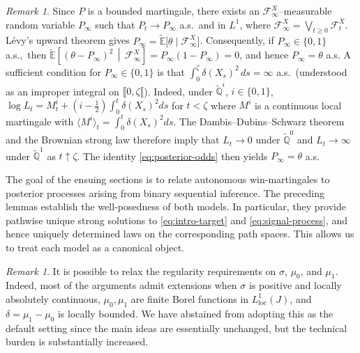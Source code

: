 \documentclass[11pt, reqno]{amsart}
\theoremstyle{plain}
\theoremstyle{remark}
\newtheorem{remark}[theorem]{Remark}
\numberwithin{equation}{section}
\begin{document}
\begin{remark}\label{rmk:consistency}
Since $P$ is a bounded martingale, there exists an
$\mathcal F_\infty^X$--measurable random variable $P_\infty$ such that
$P_t\to P_\infty$ a.s.~and in $L^1$, where
$\mathcal F_\infty^X=\bigvee_{t\geq0} \mathcal{F}^X_t$.
L\'evy's upward theorem gives $P_\infty=\widetilde{\mathbb E}
  \bigl[\theta\mid\mathcal F_\infty^X\bigr]$.
Consequently, if $P_\infty\in\{0,1\}$ a.s.,~then $\widetilde{\mathbb E}
  \left[
    (\theta-P_\infty)^2
    \,\middle|\,
    \mathcal F_\infty^X
  \right]
  =
  P_\infty(1-P_\infty)
  =
  0$,
and hence $P_\infty=\theta$ a.s. A sufficient condition for $P_\infty\in\{0,1\}$ is that $\int_0^\zeta \delta(X_s)^2\,ds=\infty$ a.s.~(understood as an improper integral on $\llbracket 0, \zeta\llbracket$). Indeed, under $\widetilde{\mathbb Q}^i$, $i\in\{0,1\}$,
$\log L_t
  =
  M_t^i
  +
  \left(i-\frac12\right)
  \int_0^t\delta(X_s)^2ds$ for $t<\zeta$
where $M^i$ is a continuous local martingale with $\langle M^i\rangle_t
  =
  \int_0^t\delta(X_s)^2ds$.
The Dambis--Dubins--Schwarz theorem
\cite[Theorem~3.4.6]{karatzas-shreve} and the Brownian strong law
therefore imply that $L_t\to0$ under $\widetilde{\mathbb Q}^0$ and
$L_t\to\infty$ under $\widetilde{\mathbb Q}^1$ as $t\uparrow\zeta$.
The identity \eqref{eq:posterior-odds} then yields
$P_\infty=\theta$ a.s.
\end{remark}



%

The goal of the ensuing sections is to relate autonomous win-martingales to posterior processes arising from binary sequential inference. The preceding lemmas establish the well-posedness of both models. In particular, they provide pathwise unique strong solutions to \eqref{eq:intro-target} and \eqref{eq:signal-process}, and hence uniquely determined laws on the corresponding path spaces. This allows us to treat each model as a canonical object.

%
%

\begin{remark}
    It is possible to relax the regularity requirements on $\sigma$, $\mu_0$, and $\mu_1$. Indeed, most of the arguments admit extensions when $\sigma$ is positive and locally absolutely continuous, $\mu_0,\mu_1$ are finite
    Borel functions in $L^1_{\mathrm{loc}}(J)$, and
    $\delta=\mu_1-\mu_0$ is locally bounded. 
    We have abstained from adopting this as the default setting since the main ideas are essentially unchanged, but the technical burden is substantially increased.
\end{remark}
\end{document}
